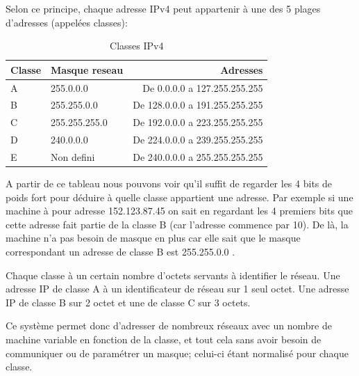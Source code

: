 Selon ce principe, chaque adresse IPv4 peut appartenir à une des 5 plages
d'adresses (appelées classes):

\begin{table}[h]
  \centering
  \begin{tabular}{| p{5cm} | p{5cm} | r |}
    \hline
    \textbf{Classe} & \textbf{Masque reseau} & \textbf{Adresses}\\
    \hline
    A & 255.0.0.0 & De 0.0.0.0 a 127.255.255.255\\
    \hline
    B & 255.255.0.0 & De 128.0.0.0 a 191.255.255.255\\
    \hline
    C & 255.255.255.0 & De 192.0.0.0 a 223.255.255.255\\
    \hline
    D & 240.0.0.0 & De 224.0.0.0 a 239.255.255.255\\
    \hline
    E & Non defini & De 240.0.0.0 a 255.255.255.255\\
    \hline
  \end{tabular}
  \caption{Classes IPv4}
  \label{tab:classes}
\end{table}

A partir de ce tableau nous pouvons voir qu'il suffit de regarder les 4 bits de
poids fort pour déduire à quelle classe appartient une adresse.  Par exemple si
une machine à pour adresse 152.123.87.45 on sait en regardant les 4 premiers
bits que cette adresse fait partie de la classe B (car l'adresse commence par
10). De là, la machine n'a pas besoin de masque en plus car elle sait que le
masque correspondant un adresse de classe B est 255.255.0.0 .

Chaque classe à un certain nombre d'octets servants à identifier le réseau. Une
adresse IP de classe A à un identificateur de réseau sur 1 seul octet. Une
adresse IP de classe B sur 2 octet et une de classe C sur 3 octets.

Ce système permet donc d'adresser de nombreux réseaux avec un nombre de machine
variable en fonction de la classe, et tout cela sans avoir besoin de
communiquer ou de paramétrer un masque; celui-ci étant normalisé pour chaque
classe.  

